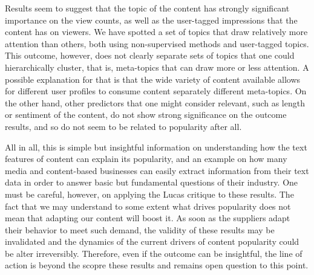 \documentclass[a4paper, 11pt]{article} %
\begin{document}
Results seem to suggest that the topic of the content has strongly significant importance on the view counts, as well as the user-tagged impressions that the content has on viewers. We have spotted a set of topics that draw relatively more attention than others, both using non-supervised methods and user-tagged topics. This outcome, however, does not clearly separate sets of topics that one could hierarchically cluster, that is, meta-topics that can draw more or less attention. A possible explanation for that is that the wide variety of content available allows for different user profiles to consume content separately different meta-topics. On the other hand, other predictors that one might consider relevant, such as length or sentiment of the content, do not show strong significance on the outcome results, and so do not seem to be related to popularity after all.

All in all, this is simple but insightful information on understanding how the text features of content can explain its popularity, and an example on how many media and content-based businesses can easily extract information from their text data in order to answer basic but fundamental questions of their industry. One must be careful, however, on applying the Lucas critique to these results. The fact that we may understand to some extent what drives popularity does not mean that adapting our content will boost it. As soon as the suppliers adapt their behavior to meet such demand, the validity of these results may be invalidated and the dynamics of the current drivers of content popularity could be alter irreversibly. Therefore, even if the outcome can be insightful, the line of action is beyond the scopre these results and remains open question to this point.


\medskip

\end{document}
